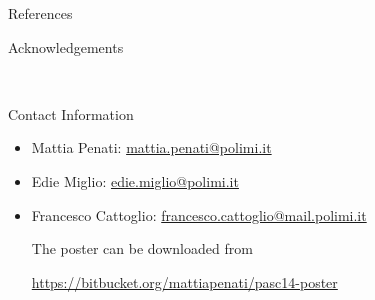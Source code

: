 \documentclass[final]{beamer}
\newlength{\onecolwid}
\begin{document}
\begin{frame}[t]
\begin{columns}[t]
\begin{column}{\onecolwid}
\begin{block}{References}
\end{block}



\begin{block}{Acknowledgements}

\small{} \\

\end{block}



\begin{alertblock}{Contact Information}

\begin{itemize}
\item Mattia Penati: \href{mailto:mattia.penati@polimi.it}{mattia.penati@polimi.it}
\item Edie Miglio: \href{mailto:edie.miglio@polimi.it}{edie.miglio@polimi.it}
\item Francesco Cattoglio: \href{mailto:francesco.cattoglio@mail.polimi.it}{francesco.cattoglio@mail.polimi.it}

\hrulefill

The poster can be downloaded from
\begin{center}
    \small
    \url{https://bitbucket.org/mattiapenati/pasc14-poster}
\end{center}
\end{itemize}

\end{alertblock}


\end{column}
\end{columns}
\end{frame}
\end{document}
